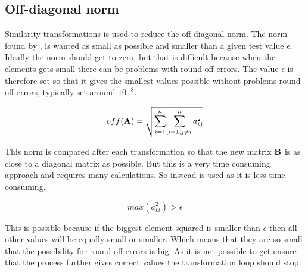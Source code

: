 \subsection{Off-diagonal norm}

Similarity transformations is used to reduce the off-diagonal norm. The norm found by , is wanted as small as possible and smaller than a given test value $\epsilon $. Ideally the norm should get to zero, but that is difficult because when the elements gets small there can be problems with round-off errors. The value $\epsilon $ is therefore set so that it gives the smallest values possible without problems round-off errors, typically set around $10^{-8}$.  

\begin{equation}
	off(\mbox{\textbf{A}}) = \sqrt{\sum_{i=1}^n\sum_{j=1,j \ne i}^n a_{ij}^2}
	\label{eq:normA}
\end{equation} 


This norm is compared after each transformation so that the new matrix $\mbox{\textbf{B}}$ is as close to a diagonal matrix as possible. But this is a very time consuming approach and requires many calculations. So instead  is used as it is less time consuming. 

\begin{equation}
	max(a_{kl}^2) > \epsilon
	\label{eq:maxa}
\end{equation}

This is possible because if the biggest element squared is smaller than $\epsilon$ then all other values will be equally small or smaller. Which means that they are so small that the possibility for round-off errors is big. As it is not possible to get ensure that the process further gives correct values the transformation loop should stop. 







